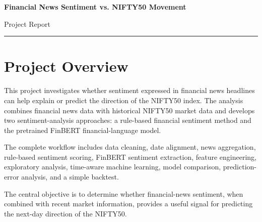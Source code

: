 \documentclass[10pt,a4paper]{article}
\begin{document}
	
	
	\begin{center}
		
		\vspace*{-0.25cm}
		
		{\Large\bfseries\color{Navy}
			Financial News Sentiment vs. NIFTY50 Movement}
		
		\vspace{3pt}
		
		{\normalsize\color{Teal}
			Project Report}
		
		\vspace{5pt}
		
		{\small\color{Gray}
			\textbf{}}
		
		\vspace{5pt}
		
		{\color{Orange}\rule{0.85\linewidth}{1.2pt}}
		
	\end{center}
	
	\section{Project Overview}
	
	This project investigates whether sentiment expressed in financial
	news headlines can help explain or predict the direction of the NIFTY50
	index. The analysis combines financial news data with historical NIFTY50
	market data and develops two sentiment-analysis approaches: a
	rule-based financial sentiment method and the pretrained FinBERT
	financial-language model.
	
	The complete workflow includes data cleaning, date alignment, news
	aggregation, rule-based sentiment scoring, FinBERT sentiment extraction,
	feature engineering, exploratory analysis, time-aware machine learning,
	model comparison, prediction-error analysis, and a simple backtest.
	
	The central objective is to determine whether financial-news sentiment,
	when combined with recent market information, provides a useful signal
	for predicting the next-day direction of the NIFTY50.
	
	
\end{document}
